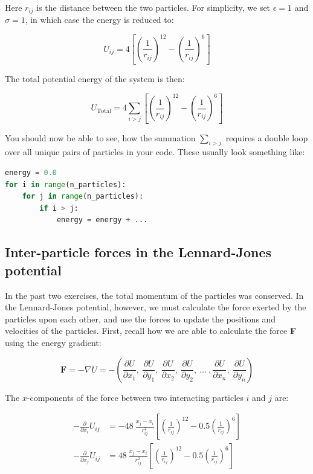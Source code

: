 \documentclass{article}
\begin{document}
Here $r_{ij}$ is the distance between the two particles. For simplicity, we
set $\epsilon = 1$ and $\sigma = 1$, in which case the energy is reduced
to:

\begin{equation}
    U_{ij} = 4 \left[ (\frac{1}{r_{ij}} )^{12} - (\frac{1}{r_{ij}} )^6 \right]
\end{equation}

The total potential energy of the system is then:

\begin{equation}
    U_{\mathrm{Total}} = 4 \sum_{i>j} \left[ (\frac{1}{r_{ij}} )^{12} - (\frac{1}{r_{ij}} )^6 \right]
\end{equation}

You should now be able to see, how the summation $\sum_{i>j}$ requires a double
loop over all unique pairs of particles in your code. These usually look
something like:

\begin{lstlisting}[language=python]
energy = 0.0
for i in range(n_particles):
    for j in range(n_particles):
        if i > j:
            energy = energy + ...
\end{lstlisting}

\subsection{Inter-particle forces in the Lennard-Jones potential}

In the past two exercises, the total momentum of the particles was conserved.
In the Lennard-Jones potential, however, we must calculate the force exerted by
the particles upon each other, and use the forces to update the positions and
velocities of the particles.
First, recall how we are able to calculate the force \textbf{F} using the
energy gradient:

\begin{equation}
    \mathbf{F} = -\nabla U = -\left( \frac{\partial U}{\partial x_1},\ \frac{\partial U}{\partial y_1},\  \frac{\partial U}{\partial x_2},\ \frac{\partial U}{\partial y_2},\ \ldots\ ,\frac{\partial U}{\partial x_n},\ \frac{\partial U}{\partial y_n}\right)
    \label{eq:force}
\end{equation}

The $x$-components of the force between two interacting particles $i$ and $j$
are:

\begin{align}
-\frac{\partial}{\partial x_i} U_{ij} &= -48\ \frac{x_j - x_i}{r^2_{ij}}\left[ (\frac{1}{r_{ij}} )^{12} - 0.5 (\frac{1}{r_{ij}} )^6 \right] \label{eq:velo_pos} \\
-\frac{\partial}{\partial x_j} U_{ij} &= 48\ \frac{x_j - x_i}{r^2_{ij}}\left[ (\frac{1}{r_{ij}} )^{12} - 0.5 (\frac{1}{r_{ij}} )^6 \right] \label{eq:velo_vel}
\end{align}
\end{document}
